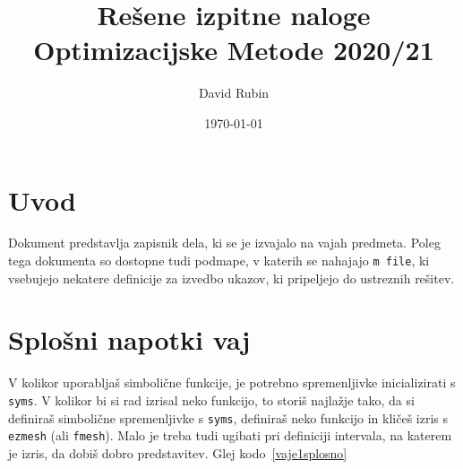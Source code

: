 \documentclass[a4paper,11pt]{article}
\title{Rešene izpitne naloge \\ 
	\large Optimizacijske Metode 2020/21}
\author{David Rubin}
\date{\today}
\begin{document}
\maketitle

\tableofcontents
\newpage


\section{Uvod}

Dokument predstavlja zapisnik dela, ki se je izvajalo na vajah predmeta. Poleg tega dokumenta so dostopne tudi podmape, v katerih se nahajajo \texttt{m file}, ki vsebujejo nekatere definicije za izvedbo ukazov, ki pripeljejo do ustreznih rešitev.

\section{Splošni napotki vaj}

V kolikor uporabljaš simbolične funkcije, je potrebno spremenljivke inicializirati s \texttt{syms}. V kolikor bi si rad izrisal neko funkcijo, to storiš najlažje tako, da si definiraš simbolične spremenljivke s \texttt{syms}, definiraš neko funkcijo in kličeš izris s \texttt{ezmesh} (ali \texttt{fmesh}). Malo je treba tudi ugibati pri definiciji intervala, na katerem je izris, da dobiš dobro predstavitev. Glej kodo~\ref{vaje1splosno}


\end{document}

